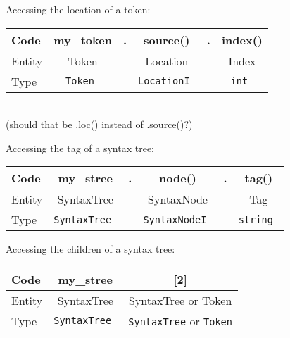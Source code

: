 \documentclass{article}
\begin{document}
\vspace{2mm}\noindent
Accessing the location of a token:\\
\begin{tabular}{|l|ccccc|}
\hline
Code    &my\_token&. & source()&. & index() \\
\hline
Entity  &Token && Location && Index \\
Type    &\tt Token && \tt LocationI && \tt int \\
\hline
\end{tabular}\\
(should that be .loc() instead of .source()?)

\vspace{2mm}\noindent
Accessing the tag of a syntax tree:\\
\begin{tabular}{|l|ccccc|}
\hline
Code    &my\_stree&. & node()&. & tag() \\
\hline
Entity  &SyntaxTree && SyntaxNode && Tag \\
Type    &\tt SyntaxTree && \tt SyntaxNodeI && \tt string \\
\hline
\end{tabular}

\vspace{2mm}\noindent
Accessing the children of a syntax tree:\\
\begin{tabular}{|l|cc|}
\hline
Code    &my\_stree& [2] \\
\hline
Entity  &SyntaxTree & SyntaxTree or Token \\
Type    &\tt SyntaxTree & {\tt SyntaxTree} or {\tt Token}\\
\hline
\end{tabular}
\end{document}
